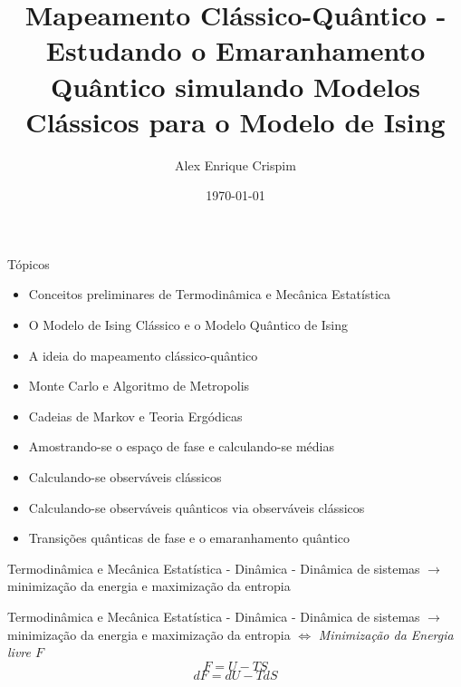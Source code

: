 \documentclass[10pt]{beamer}
\title{Mapeamento Clássico-Quântico - Estudando o Emaranhamento Quântico  simulando Modelos Clássicos para o Modelo de Ising }
\author{Alex Enrique Crispim}
\date{\today}
\begin{document}
\maketitle

\begin{frame}{Tópicos}
	\begin{itemize}
		\item Conceitos preliminares de Termodinâmica e Mecânica Estatística 
		\item O Modelo de Ising Clássico e o Modelo Quântico de Ising
		\item A ideia do mapeamento clássico-quântico
		\item Monte Carlo e Algoritmo de Metropolis
		\item Cadeias de Markov e Teoria Ergódicas
		\item Amostrando-se o espaço de fase e calculando-se médias
		\item Calculando-se observáveis clássicos
		\item Calculando-se observáveis quânticos via observáveis clássicos
		\item Transições quânticas de fase e o emaranhamento quântico	
	\end{itemize}
\end{frame}






\begin{frame}{Termodinâmica e Mecânica Estatística - Dinâmica}
	- Dinâmica de sistemas $\to$ minimização da energia e maximização da entropia
\end{frame}

\begin{frame}{Termodinâmica e Mecânica Estatística - Dinâmica}
	- Dinâmica de sistemas $\to$ minimização da energia e maximização da entropia $\Leftrightarrow$ \textit{Minimização da Energia livre $F$}\\
	
	\begin{equation*}
		F = U - TS
	\end{equation*}
		\begin{equation*}
		dF = dU - TdS
	\end{equation*}

\end{frame}
\end{document}
